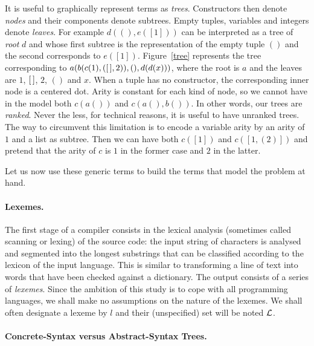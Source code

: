 \piccaption{\label{tree}}
\smallskip
{} It is
useful to graphically represent terms as \emph{trees}. Constructors
then denote \emph{nodes} and their components denote subtrees. Empty
tuples, variables and integers denote \emph{leaves}. For example
\(d((), e([1]))\) can be interpreted as a tree of \emph{root} \(d\)
and whose first subtree is the representation of the empty tuple
\(()\) and the second corresponds to \(e([1])\). Figure~\ref{tree}
represents the tree corresponding to \(a(b(c(1), ([\,], 2)), (),
d(d(x)))\), where the root is \(a\) and the leaves are \(1\), \([\,]\),
\(2\), \(()\) and \(x\). When a tuple has no constructor, the
corresponding inner node is a centered dot. Arity is constant for each
kind of node, so we cannot have in the model both \(c(a())\) and
\(c(a(),b())\). In other words, our trees are \emph{ranked}. Never the
less, for technical reasons, it is useful to have unranked trees. The
way to circumvent this limitation is to encode a variable arity by an
arity of \(1\) and a list as subtree. Then we can have both \(c([1])\)
and \(c([1, (2)])\) and pretend that the arity of \(c\) is \(1\) in
the former case and \(2\) in the latter.

Let us now use these generic terms to build the terms that model the
problem at hand.

\paragraph{Lexemes.}

The first stage of a compiler consists in the lexical analysis
(sometimes called scanning or lexing) of the source code: the input
string of characters is analysed and segmented into the longest
substrings that can be classified according to the lexicon of the
input language. This is similar to transforming a line of text into
words that have been checked against a dictionary. The output consists
of a series of \emph{lexemes}. Since the ambition of this study is to
cope with all programming languages, we shall make no assumptions on
the nature of the lexemes. We shall often designate a lexeme by \(l\)
and their (unspecified) set will be noted \(\cal L\).

\paragraph{Concrete\hyp{}Syntax versus Abstract\hyp{}Syntax Trees.}

